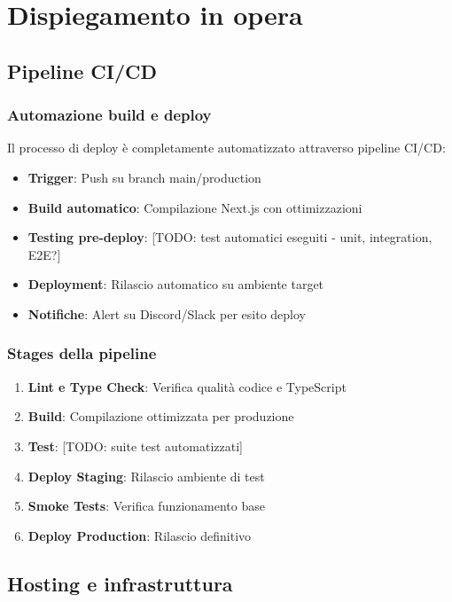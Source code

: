 \chapter{Dispiegamento in opera}

\section{Pipeline CI/CD}
\subsection{Automazione build e deploy}
Il processo di deploy è completamente automatizzato attraverso pipeline CI/CD:
\begin{itemize}
  \item \textbf{Trigger}: Push su branch main/production
  \item \textbf{Build automatico}: Compilazione Next.js con ottimizzazioni
  \item \textbf{Testing pre-deploy}: [TODO: test automatici eseguiti - unit, integration, E2E?]
  \item \textbf{Deployment}: Rilascio automatico su ambiente target
  \item \textbf{Notifiche}: Alert su Discord/Slack per esito deploy
\end{itemize}

\subsection{Stages della pipeline}
\begin{enumerate}
  \item \textbf{Lint e Type Check}: Verifica qualità codice e TypeScript
  \item \textbf{Build}: Compilazione ottimizzata per produzione
  \item \textbf{Test}: [TODO: suite test automatizzati]
  \item \textbf{Deploy Staging}: Rilascio ambiente di test
  \item \textbf{Smoke Tests}: Verifica funzionamento base
  \item \textbf{Deploy Production}: Rilascio definitivo
\end{enumerate}

\section{Hosting e infrastruttura}
